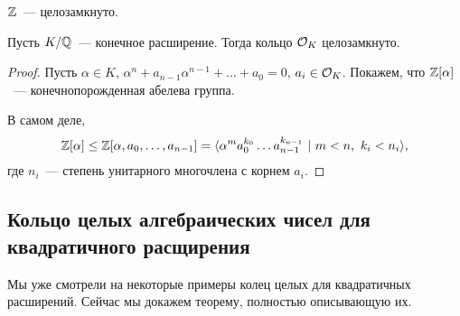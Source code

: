  	\begin{example}
 		$\mathbb{Z}$~--- целозамкнуто. 
 	\end{example}

 	\begin{theorem} 
 		Пусть $K/\mathbb{Q}$~--- конечное расширение. Тогда кольцо $\mathcal{O}_{K}$ целозамкнуто. 
 	\end{theorem}
 	\begin{proof}
 		Пусть $\alpha \in K$, $\alpha^n + a_{n - 1}\alpha^{n - 1} + \ldots + a_0 = 0$, $a_i \in \mathcal{O}_{K}$. Покажем, что $\mathbb{Z}[\alpha]$~--- конечнопорожденная абелева группа. 

 		В самом деле, 
 		\[
 			\mathbb{Z}[\alpha] \le \mathbb{Z}[\alpha, a_0, \ldots, a_{n - 1}] = \langle \alpha^m a_0^{k_0} \ldots a_{n - 1}^{k_{n - 1}}\ \vert \ m < n, \ k_i < n_i \rangle, 
 		\]
 		где $n_i$~--- степень унитарного многочлена с корнем $a_i$.
 	\end{proof}

 	\subsection{Кольцо целых алгебраических чисел для квадратичного расщирения}

	Мы уже смотрели на некоторые примеры колец целых для квадратичных расширений. Сейчас мы докажем теорему, полностью описывающую их. 

